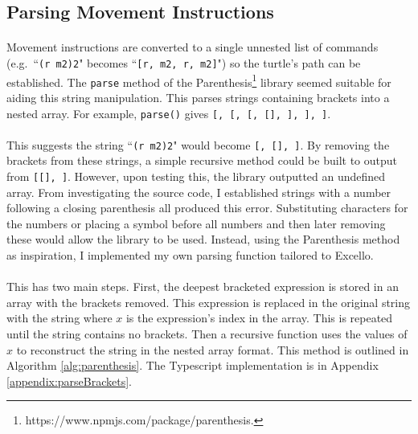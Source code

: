 \subsection{Parsing Movement Instructions}

\paragraph{} Movement instructions are converted to a single unnested list of commands (e.g.~``\texttt{(r m2)2}" becomes ``\texttt{[r, m2, r, m2]}") so the turtle's path can be established. The \texttt{parse} method of the Parenthesis\footnote{https://www.npmjs.com/package/parenthesis.} library seemed suitable for aiding this string manipulation. This parses strings containing brackets into a nested array. For example, \texttt{parse(\textcolor[rgb]{0,0.7,0}{})} gives \texttt{[\textcolor[rgb]{0,0.7,0}{}, [\textcolor[rgb]{0,0.7,0}{\upquote{b[}}, [\textcolor[rgb]{0,0.7,0}{}, [\textcolor[rgb]{0,0.7,0}{}], \textcolor[rgb]{0,0.7,0}{\upquote{\}}}], \textcolor[rgb]{0,0.7,0}{\upquote{]}}], \textcolor[rgb]{0,0.7,0}{\upquote{)}}]}.

\paragraph{} This suggests the string ``\texttt{(r m2)2}" would become \texttt{[\upquote{(}, [], ]}.  By removing the brackets from these strings, a simple recursive method could be built to output \texttt{} from \texttt{[[], ]}. However, upon testing this, the library outputted an undefined array. From investigating the source code, I established strings with a number following a closing parenthesis all produced this error. Substituting characters for the numbers or placing a symbol before all numbers and then later removing these would allow the library to be used. Instead, using the Parenthesis method as inspiration, I implemented my own parsing function tailored to Excello.

\paragraph{} This has two main steps. First, the deepest bracketed expression is stored in an array with the brackets removed. This expression is replaced in the original string with the string  where $x$ is the expression's index in the array. This is repeated until the string contains no brackets. Then a recursive function uses the values of $x$ to reconstruct the string in the nested array format. This method is outlined in Algorithm \ref{alg:parenthesis}. The Typescript implementation is in Appendix \ref{appendix:parseBrackets}.

